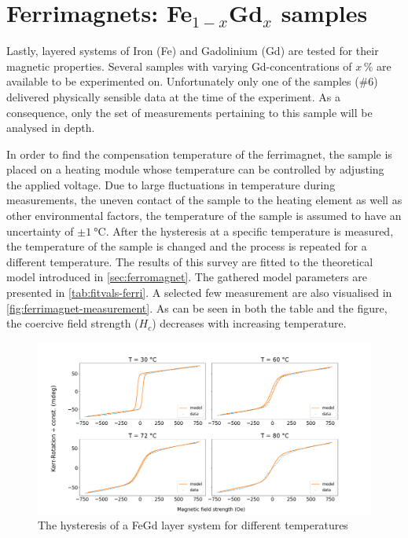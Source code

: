 
\section{Ferrimagnets: Fe$_{1-x}$Gd$_x$ samples}
\label{sec:ferrimagnets}

Lastly, layered systems of Iron (Fe) and Gadolinium (Gd) are tested for their
magnetic properties. Several samples with varying Gd-concentrations of $x\,\%$ are 
available to be experimented on. Unfortunately only one of the samples ($\#6$)
delivered physically sensible data at the time of the experiment. As a consequence, 
only the set of measurements pertaining to this sample will be analysed in depth.

In order to find the compensation temperature of the ferrimagnet, the sample is 
placed on a heating module whose temperature can be controlled by adjusting the 
applied voltage. Due to large fluctuations in temperature during measurements, the 
uneven contact of the sample to the heating element as well as other environmental 
factors, the temperature of the sample is assumed to have an uncertainty of 
$\pm\SI{1}{\celsius}$. After the hysteresis at a specific temperature is measured,
the temperature of the sample is changed and the process is repeated for a different
temperature. The results of this survey are fitted to the theoretical model 
introduced in \autoref{sec:ferromagnet}. The gathered model parameters are presented 
in \autoref{tab:fitvals-ferri}. A selected few measurement are also visualised in 
\autoref{fig:ferrimagnet-measurement}. As can be seen in both the table and the
figure, the coercive field strength ($H_c$) decreases with increasing temperature.

\begin{figure}
	\centering
	\includegraphics[width=1.0\textwidth]{./fig/ferrimagnet_measurement.png}
	\caption{The hysteresis of a FeGd layer system for different temperatures}
	\label{fig:ferrimagnet-measurement}
\end{figure}



